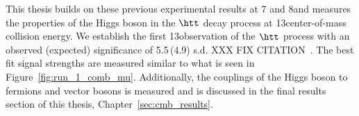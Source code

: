 This thesis builds on these previous experimental results at 7 and 8\TeV and measures the
properties of the Higgs boson in the $\htt$ decay process at 13\TeV center-of-mass 
collision energy. We establish the first 13\TeV observation of the $\htt$
process with an observed (expected) significance of 5.5\,(4.9) s.d. XXX FIX CITATION~\cite{HIG-18-007}. 
The best fit signal strengths are measured similar
to what is seen in Figure~\ref{fig:run_1_comb_mu}. Additionally, the couplings of the
Higgs boson to fermions and vector bosons is measured and is discussed in the final results
section of this thesis, Chapter~\ref{sec:cmb_results}.


%

